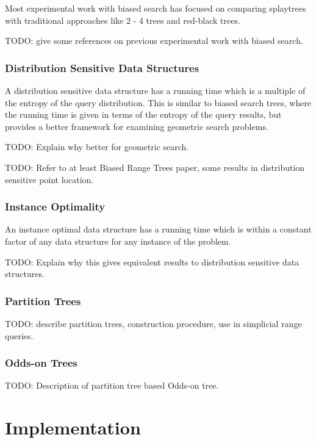 \documentclass[mcs]{scsthesis}
\begin{document}
Most experimental work with biased search has focused on comparing splaytrees
with traditional approaches like 2 - 4 trees and red-black trees.

TODO: give some references on previous experimental work with biased search.

\subsection{Distribution Sensitive Data Structures}

A distribution sensitive data structure has a running time which is a multiple 
of the entropy of the query distribution.  This is similar to biased search
trees, where the running time is given in terms of the entropy of the query
results, but provides a better framework for examining geometric search
problems.

TODO: Explain why better for geometric search.

TODO: Refer to at least Biased Range Trees paper, some results in distribution
sensitive point location.

\subsection{Instance Optimality}

An instance optimal data structure \cite{chan} has a running time which is
within a constant factor of any data structure for any instance of the problem.

TODO: Explain why this gives equivalent results to distribution sensitive data
structures.


\subsection{Partition Trees}

TODO: describe partition trees, construction procedure, use in simplicial
range queries.

\subsection{Odds-on Trees}

TODO: Description of partition tree based Odds-on tree.


\chapter{Implementation}
\end{document}
